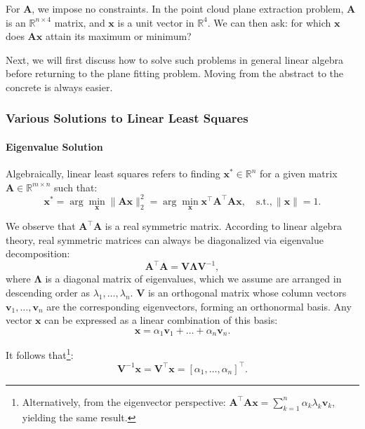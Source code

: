 For $\bm{A}$, we impose no constraints. In the point cloud plane extraction problem, $\bm{A}$ is an $\mathbb{R}^{n \times 4}$ matrix, and $\bm{x}$ is a unit vector in $\mathbb{R}^4$. We can then ask: for which $\bm{x}$ does $\bm{A}\bm{x}$ attain its maximum or minimum?

Next, we will first discuss how to solve such problems in general linear algebra before returning to the plane fitting problem. Moving from the abstract to the concrete is always easier.

\subsubsection{Various Solutions to Linear Least Squares}
\paragraph{Eigenvalue Solution}
Algebraically, linear least squares refers to finding $\bm{x}^* \in \mathbb{R}^n$ for a given matrix $\bm{A} \in \mathbb{R}^{m \times n}$ such that:
\begin{equation}\label{key}
	\bm{x}^* = \arg \min_{\bm{x}} \|\bm{A} \bm{x} \|^2_2 =  \arg \min_{\bm{x}} \bm{x}^\top \bm{A}^\top 
	\bm{A} \bm{x}, \quad \text{s.t.}, \| \bm{x} \| = 1.
\end{equation}

We observe that $\bm{A}^\top \bm{A}$ is a real symmetric matrix. According to linear algebra theory, real symmetric matrices can always be diagonalized via eigenvalue decomposition:
\begin{equation}\label{key}
	\bm{A}^\top \bm{A} = \bm{V} \boldsymbol{\Lambda} \bm{V}^{-1},
\end{equation}
where $\boldsymbol{\Lambda}$ is a diagonal matrix of eigenvalues, which we assume are arranged in descending order as $\lambda_1, \ldots, \lambda_n$. $\bm{V}$ is an orthogonal matrix whose column vectors $\bm{v}_1, \ldots, \bm{v}_n$ are the corresponding eigenvectors, forming an orthonormal basis. Any vector $\bm{x}$ can be expressed as a linear combination of this basis:
\begin{equation}\label{key}
	\bm{x} = \alpha_1 \bm{v}_1 + \ldots + \alpha_n \bm{v}_n.
\end{equation}

It follows that\footnote{Alternatively, from the eigenvector perspective: $\bm{A}^\top \bm{A} \bm{x} = \sum_{k=1}^{n} \alpha_k \lambda_k \bm{v}_k$, yielding the same result.}:
\begin{equation}\label{key}
	\bm{V}^{-1} \bm{x} = \bm{V}^\top \bm{x} = [\alpha_1, \ldots, \alpha_n]^\top. 
\end{equation}


